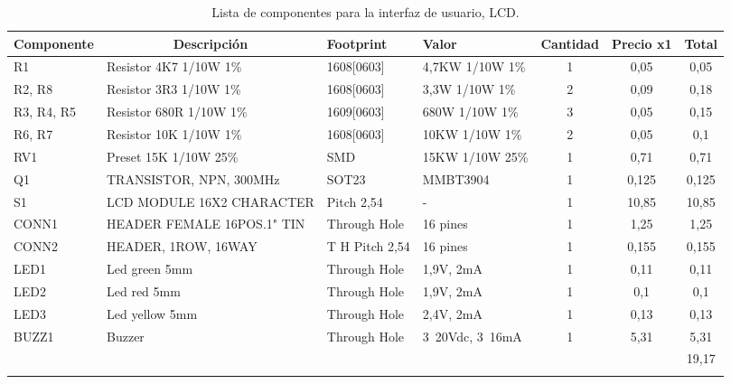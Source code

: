\begin{longtable}{|l|p{3cm}|p{2cm}|p{2cm}|c|c|c|}
\hline
\multicolumn{1}{|c|}{\textbf{Componente}} & \multicolumn{1}{c|}{\textbf{Descripción}} & \textbf{ Footprint} & \textbf{Valor} & \textbf{Cantidad} & \textbf{Precio x1} & \textbf{Total} \\ \hline
R1 & Resistor 4K7    1/10W     1\% & 1608[0603] & 4,7KW  1/10W   1\% & 1 & 0,05 & 0,05 \\ \hline
R2, R8 & Resistor 3R3    1/10W     1\% & 1608[0603] & 3,3W    1/10W   1\% & 2 & 0,09 & 0,18 \\ \hline
R3, R4, R5 & Resistor 680R  1/10W     1\% & 1609[0603] & 680W   1/10W   1\% & 3 & 0,05 & 0,15 \\ \hline
R6, R7 & Resistor 10K    1/10W     1\% & 1608[0603] & 10KW  1/10W   1\% & 2 & 0,05 & 0,1 \\ \hline
RV1 & Preset 15K        1/10W  25\% & SMD & 15KW   1/10W  25\% & 1 & 0,71 & 0,71 \\ \hline
Q1 & TRANSISTOR, NPN, 300MHz & SOT23 & MMBT3904 & 1 & 0,125 & 0,125 \\ \hline
S1 & LCD MODULE 16X2 CHARACTER & Pitch 2,54 & - & 1 & 10,85 & 10,85 \\ \hline
CONN1 & HEADER FEMALE 16POS.1" TIN & Through Hole & 16 pines & 1 & 1,25 & 1,25 \\ \hline
CONN2 & HEADER, 1ROW, 16WAY & T H Pitch 2,54 & 16 pines & 1 & 0,155 & 0,155 \\ \hline
LED1 & Led green 5mm & Through Hole & 1,9V,  2mA & 1 & 0,11 & 0,11 \\ \hline
LED2 & Led red 5mm & Through Hole & 1,9V,  2mA & 1 & 0,1 & 0,1 \\ \hline
LED3 & Led yellow 5mm & Through Hole & 2,4V,  2mA & 1 & 0,13 & 0,13 \\ \hline
BUZZ1 & Buzzer & Through Hole & 3~20Vdc, 3~16mA & 1 & 5,31 & 5,31 \\ \hline
 &  & \multicolumn{1}{l|}{} & \multicolumn{1}{l|}{} & \multicolumn{1}{l|}{} & \multicolumn{1}{l|}{} & 19,17 \\ \hline
\caption{Lista de componentes para la interfaz de usuario, LCD.}
\label{}
\end{longtable}


